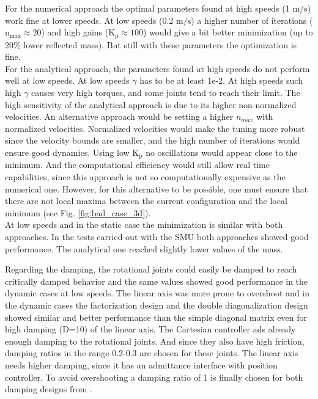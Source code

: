 For the numerical approach the optimal parameters found at high speeds (1 $\mathrm{m/s}$) work fine at lower speeds. At low speeds (0.2 $\mathrm{m/s}$) a higher number of iterations ($\mathrm{n_{max} \approx 20}$) and high gains ($\mathrm{K_p \approx 100}$) would give a bit better minimization (up to 20\% lower reflected mass). But still with these parameters the optimization is fine. \\
%
 For the analytical approach, the parameters found at high speeds do not perform well at low speeds. At low speeds  $\gamma$ has to be at least 1e-2. At high speeds such high $\gamma$ causes very high torques, and some joints tend to reach their limit. The high sensitivity of the analytical approach is due to its higher non-normalized velocities. An alternative approach would be setting a higher $n_{max}$ with normalized velocities. Normalized velocities would make the tuning more robust since the velocity bounds are smaller, and the high number of iterations would ensure good dynamics. Using low $\mathrm{K_p}$  no oscillations would appear close to the minimum. And the computational efficiency would still allow real time capabilities, since this approach is not so computationally expensive as the numerical one.   
 However, for this alternative to be possible, one must ensure that there are not local maxima between the current configuration and the local minimum (see Fig. \ref{fig:bad_case_3d}).\\
%
At low speeds and in the static case the minimization is similar with both approaches. In the tests carried out with the SMU both approaches showed good performance. The analytical one reached slightly lower values of the mass. 


Regarding the damping, the rotational joints could easily be damped to reach critically damped behavior and the same values showed good performance in the dynamic cases at low speeds. The linear axis was more prone to overshoot and in the dynamic cases the factorization design and the double diagonalization design showed similar and better performance than the simple diagonal matrix even for high damping (D=10) of the linear axis. 
The Cartesian controller ads already enough damping to the rotational joints. And since they also have high friction, damping ratios in the range 0.2-0.3 are chosen for these joints. The linear axis needs higher damping, since it has an admittance interface with position controller. To avoid overshooting a damping ratio of 1 is finally chosen for both damping designs from \cite{alin_damping}.

